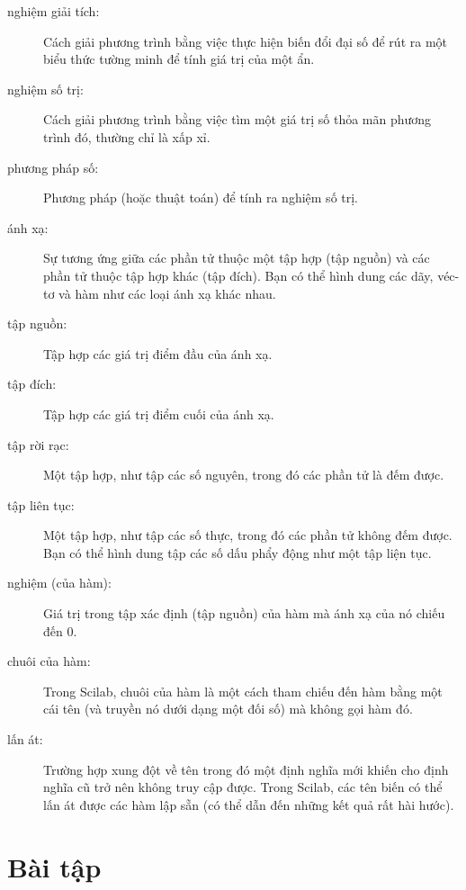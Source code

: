 \documentclass[12pt]{book}
\begin{document}
\begin{description}

\item[nghiệm giải tích:] Cách giải phương trình bằng việc thực hiện
biến đổi đại số để rút ra một biểu thức tường minh để tính giá trị
của một ẩn.

\item[nghiệm số trị:] Cách giải phương trình bằng việc tìm một 
giá trị số thỏa mãn phương trình đó, thường chỉ là xấp xỉ.

\item[phương pháp số:] Phương pháp (hoặc thuật toán) để tính ra
nghiệm số trị.

\item[ánh xạ:] Sự tương ứng giữa các phần tử thuộc một tập hợp
(tập nguồn) và các phần tử thuộc tập hợp khác (tập đích). Bạn có thể
hình dung các dãy, véc-tơ và hàm như các loại ánh xạ khác nhau.

\item[tập nguồn:] Tập hợp các giá trị điểm đầu của ánh xạ.

\item[tập đích:] Tập hợp các giá trị điểm cuối của ánh xạ.

\item[tập rời rạc:] Một tập hợp, như tập các số nguyên, trong đó
các phần tử là đếm được.

\item[tập liên tục:] Một tập hợp, như tập các số thực, trong đó
các phần tử không đếm được. Bạn có thể hình dung tập các số dấu
phẩy động như một tập liện tục.

\item[nghiệm (của hàm):] Giá trị trong tập xác định (tập nguồn) của
hàm mà ánh xạ của nó chiếu đến 0.

\item[chuôi của hàm:] Trong Scilab, chuôi của hàm là một cách
tham chiếu đến hàm bằng một cái tên (và truyền nó dưới dạng một
đối số) mà không gọi hàm đó.

\item[lấn át:] Trường hợp xung đột về tên trong đó một định nghĩa mới
khiến cho định nghĩa cũ trở nên không truy cập được. Trong Scilab,
các tên biến có thể lấn át được các hàm lập sẵn (có thể dẫn đến những
kết quả rất hài hước).

\end{description}

\section{Bài tập}
\end{document}
